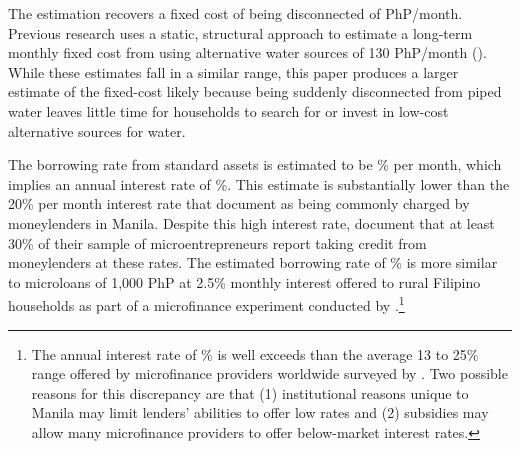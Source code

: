 \documentclass[12pt]{article}
\begin{document}
The estimation recovers a fixed cost of being disconnected of PhP/month.  Previous research uses a static, structural approach to estimate a long-term monthly fixed cost from using alternative water sources of 130 PhP/month (\cite{wjv}).  While these estimates fall in a similar range, this paper produces a larger estimate of the fixed-cost likely because being suddenly disconnected from piped water leaves little time for households to search for or invest in low-cost alternative sources for water.

The borrowing rate from standard assets is estimated to be \unskip\% per month, which implies an annual interest rate of \unskip\%.  This estimate is substantially lower than the 20\% per month interest rate that \cite{karlan2009expanding} document as being commonly charged by moneylenders in Manila.  Despite this high interest rate, \cite{karlan2009expanding} document that at least 30\% of their sample of microentrepreneurs report taking credit from moneylenders at these rates.  The estimated borrowing rate of \unskip\% is more similar to microloans of 1,000 PhP at 2.5\% monthly interest offered to rural Filipino households as part of a microfinance experiment conducted by \cite{gine2014group}.\footnote{The annual interest rate of \unskip\% is well exceeds than the average 13 to 25\% range offered by microfinance providers worldwide surveyed by \cite{cull2009microfinance}.  Two possible reasons for this discrepancy are that (1) institutional reasons unique to Manila may limit lenders' abilities to offer low rates and (2) subsidies may allow many microfinance providers to offer below-market interest rates.}
\end{document}
